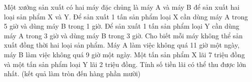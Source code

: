 \begin{ex}
 Một xưởng sản xuất có hai máy đặc chủng là máy A và máy B để sản xuất hai loại sản phẩm X và Y. Để sản xuất 1 tấn sản phẩm loại X cần dùng máy A trong 5 giờ và dùng máy B trong 1 giờ. Để sản xuất 1 tấn sản phẩm loại Y cần dùng máy A trong 3 giờ và dùng máy B trong 3 giờ. Cho biết mỗi máy không thể sản xuất đồng thời hai loại sản phẩm. Máy A làm việc không quá 11 giờ một ngày, máy B làm việc không quá 9 giờ một ngày. Một tấn sản phẩm X lãi 7 triệu đồng và một tấn sản phẩm loại Y lãi 2 triệu đồng. Tính số tiền lãi có thể thu được lớn nhất. (kết quả làm tròn đến hàng phần mười)


\end{ex}

